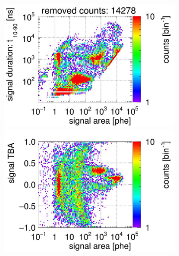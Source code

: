 \begin{landscape}
\begin{figure}[!p]
\begin{subfigure}[t]{0.32\textwidth}
			\includegraphics[width=\figurewidth,clip,trim={0 98 0 15}]{Figures/GasTest/CutsValid/res64769/pdpaX23Vecfig64769.jpg}
			\includegraphics[width=\figurewidth,clip,trim={0 8 0 40}]{Figures/GasTest/CutsValid/res64769/tbapaX23Vecfig64769.jpg}
			\caption{}
			\label{fig:signal selection dv 14 02}
		\end{subfigure}
		\begin{subfigure}[t]{0.32\textwidth}
			\centering

\end{subfigure}
\end{figure}
\end{landscape}

